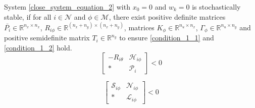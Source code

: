 \documentclass[conference]{IEEEtran}
\begin{document}
%
%
%

System \eqref{close_system_equation_2} with $x_0=0$ and $w_{k}=0$ is stochastically stable, if for all $i \in \mathcal{N}$ and $\phi \in \mathcal{M}$, there exist positive definite matrices $\bar{P_i} \in \mathbb{R}^{n_x\times n_x}$, $R_{i\phi } \in \mathbb{R}^{(n_x+n_y)\times(n_x+n_y)}$, matrices $K_{\phi} \in \mathbb{R}^{n_u\times n_x}$, $\varGamma_{\phi} \in \mathbb{R}^{n_u \times n_y}$ and positive semidefinite matrix $T_{i}\in \mathbb{R}^{n_y}$ to  ensure \eqref{condition_1_1} and \eqref{condition_1_2} hold.
\begin{equation}\label{condition_1_1}
\begin{bmatrix}
-R_{i\theta}&\mathscr{H}_{i\phi}\\
*&\mathscr{P}_{i}
\end{bmatrix}<0
\end{equation}


\begin{equation}\label{condition_1_2}
\begin{bmatrix}
\mathscr{S}_{i\phi}&\mathscr{N}_{i\phi}\\
*&\mathscr{L}_{i\phi}
\end{bmatrix}<0
\end{equation}
\end{document}
